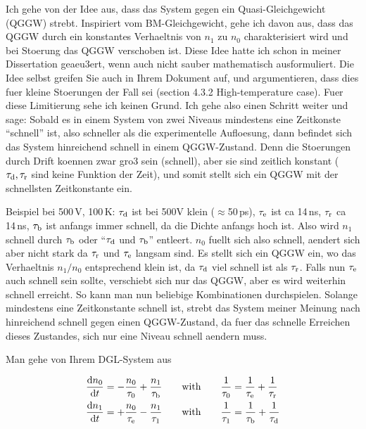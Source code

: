 
Ich gehe von der Idee aus, dass das System gegen ein Quasi-Gleichgewicht (QGGW) strebt. 
Inspiriert vom BM-Gleichgewicht, gehe ich davon aus, dass das QGGW durch ein konstantes Verhaeltnis von $n_1$ zu $n_0$ charakterisiert wird und bei Stoerung das QGGW verschoben ist. 
Diese Idee hatte ich schon in meiner Dissertation geaeu3ert, wenn auch nicht sauber mathematisch ausformuliert. 
Die Idee selbst greifen Sie auch in Ihrem Dokument auf, und argumentieren, dass dies fuer kleine Stoerungen der Fall sei (section 4.3.2 High-temperature case). 
Fuer diese Limitierung sehe ich keinen Grund. 
Ich gehe also einen Schritt weiter und sage: 
Sobald es in einem System von zwei Niveaus mindestens eine Zeitkonste ``schnell'' ist, also schneller als die experimentelle Aufloesung, 
 dann befindet sich das System hinreichend schnell in einem QGGW-Zustand. 
Denn die Stoerungen durch Drift koennen zwar gro3 sein (schnell), aber sie sind zeitlich konstant ($\tau_{\textrm{d}}, \tau_\textrm{r}$ sind keine Funktion der Zeit),
 und somit stellt sich ein QGGW mit der schnellsten Zeitkonstante ein.
 
Beispiel bei 500\,V, 100\,K:
$\tau_{\textrm{d}}$ ist bei 500V klein ($\approx$50\,ps), $\tau_\textrm{e}$ ist ca 14\,ns, $\tau_\textrm{r}$ ca 14\,ns, $\tau_{\textrm{b}}$ ist anfangs immer schnell, da die Dichte anfangs hoch ist.
Also wird $n_1$ schnell durch $\tau_{\textrm{b}}$ oder ``$\tau_{\textrm{d}}$ und $\tau_{\textrm{b}}$'' entleert. 
$n_0$ fuellt sich also schnell, aendert sich aber nicht stark da $\tau_\textrm{r}$ und $\tau_\textrm{e}$ langsam sind. 
Es stellt sich ein QGGW ein, wo das Verhaeltnis $n_1/n_0$ entsprechend klein ist, da $\tau_{\textrm{d}}$ viel schnell ist als $\tau_\textrm{r}$.
Falls nun $\tau_\textrm{e}$ auch schnell sein sollte, verschiebt sich nur das QGGW, aber es wird weiterhin schnell erreicht. 
So kann man nun beliebige Kombinationen durchspielen.
Solange mindestens eine Zeitkonstante schnell ist, strebt das System meiner Meinung nach hinreichend schnell gegen einen QGGW-Zustand, da fuer das schnelle Erreichen dieses Zustandes, 
 sich nur eine Niveau schnell aendern muss. 
 
Man gehe von Ihrem DGL-System aus

\begin{align}
\frac{\mathrm d n_0}{\mathrm d t} &= -\frac{n_0}{\tau_{0}} + \frac{n_1}{\tau_{\textrm{b}}} \qquad \textrm{with}    \qquad\frac{1}{\tau_{0}}= \frac{1}{\tau_\textrm{e}} + \frac{1}{\tau_\textrm{r}} \\
 \frac{\mathrm d n_1}{\mathrm d t} &= +\frac{n_0}{\tau_\textrm{e}} - \frac{n_1}{\tau_{1}}  \qquad \textrm{with} \qquad\frac{1}{\tau_{1}} = \frac{1}{\tau_{\textrm{b}}} + \frac{1}{\tau_{\textrm{d}}} 
 \label{math:diff22}
\end{align}


